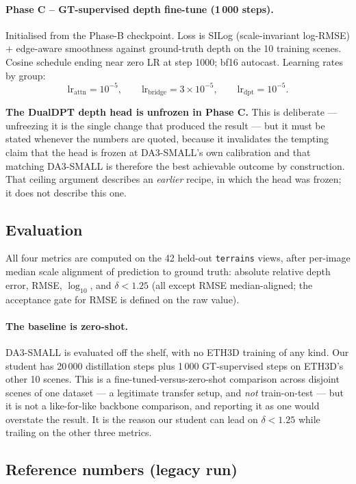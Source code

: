 \documentclass[11pt,a4paper]{article}
\begin{document}
\paragraph{Phase C -- GT-supervised depth fine-tune (1\,000 steps).}
Initialised from the Phase-B checkpoint. Loss is SILog (scale-invariant
log-RMSE) $+$ edge-aware smoothness against ground-truth depth on the 10
training scenes. Cosine schedule ending near zero LR at step 1000; bf16
autocast. Learning rates by group:
\[
  \text{lr}_{\text{attn}} = 10^{-5}, \qquad
  \text{lr}_{\text{bridge}} = 3\times10^{-5}, \qquad
  \text{lr}_{\text{dpt}} = 10^{-5}.
\]

\noindent\textbf{The DualDPT depth head is unfrozen in Phase C.} This is
deliberate --- unfreezing it is the single change that produced the result --- but
it must be stated whenever the numbers are quoted, because it invalidates the
tempting claim that the head is frozen at DA3-SMALL's own calibration and that
matching DA3-SMALL is therefore the best achievable outcome by construction.
That ceiling argument describes an \emph{earlier} recipe, in which the head was
frozen; it does not describe this one.

\subsection{Evaluation}
\label{sec:eth3d-depth-eval}

All four metrics are computed on the 42 held-out \texttt{terrains} views, after
per-image median scale alignment of prediction to ground truth: absolute
relative depth error, RMSE, $\log_{10}$, and $\delta{<}1.25$ (all except RMSE
median-aligned; the acceptance gate for RMSE is defined on the raw value).

\paragraph{The baseline is zero-shot.} DA3-SMALL is evaluated off the shelf,
with no ETH3D training of any kind. Our student has 20\,000 distillation steps
plus 1\,000 GT-supervised steps on ETH3D's other 10 scenes. This is a
fine-tuned-versus-zero-shot comparison across disjoint scenes of one dataset ---
a legitimate transfer setup, and \emph{not} train-on-test --- but it is not a
like-for-like backbone comparison, and reporting it as one would overstate the
result. It is the reason our student can lead on $\delta{<}1.25$ while trailing
on the other three metrics.

\subsection{Reference numbers (legacy run)}
\label{sec:eth3d-depth-legacy}
\end{document}
